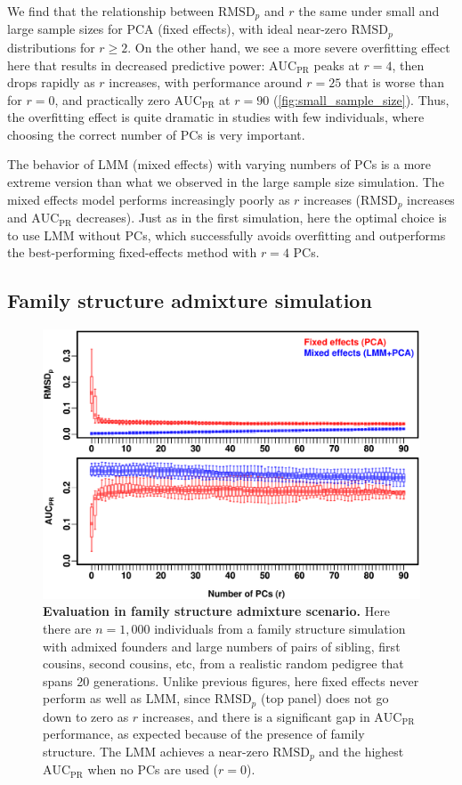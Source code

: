 \documentclass[11pt]{article}
\newcommand{\rmsd}{\text{RMSD}_p}
\newcommand{\auc}{\text{AUC}_\text{PR}}
\begin{document}
We find that the relationship between $\rmsd$ and $r$ the same under small and large sample sizes for PCA (fixed effects), with ideal near-zero $\rmsd$ distributions for $r \ge 2$.
On the other hand, we see a more severe overfitting effect here that results in decreased predictive power: $\auc$ peaks at $r = 4$, then drops rapidly as $r$ increases, with performance around $r = 25$ that is worse than for $r = 0$, and practically zero $\auc$ at $r = 90$ (\cref{fig:small_sample_size}).
Thus, the overfitting effect is quite dramatic in studies with few individuals, where choosing the correct number of PCs is very important.

The behavior of LMM (mixed effects) with varying numbers of PCs is a more extreme version than what we observed in the large sample size simulation.
The mixed effects model performs increasingly poorly as $r$ increases ($\rmsd$ increases and $\auc$ decreases).
Just as in the first simulation, here the optimal choice is to use LMM without PCs, which successfully avoids overfitting and outperforms the best-performing fixed-effects method with $r=4$ PCs.



\subsection{Family structure admixture simulation}

\begin{figure}[bp!]
  \centering
  \includegraphics[width=6in]{PCA_data/PCA_GCTApcs/boxplot_n_1000_family.pdf}
  \caption{
    {\bf Evaluation in family structure admixture scenario.}
    Here there are $n = 1,000$ individuals from a family structure simulation with admixed founders and large numbers of pairs of sibling, first cousins, second cousins, etc, from a realistic random pedigree that spans 20 generations.
    Unlike previous figures, here fixed effects never perform as well as LMM, since $\rmsd$ (top panel) does not go down to zero as $r$ increases, and there is a significant gap in $\auc$ performance, as expected because of the presence of family structure.
    The LMM achieves a near-zero $\rmsd$ and the highest $\auc$ when no PCs are used ($r=0$).
  }
  \label{fig:family_structure}
\end{figure}
\end{document}
